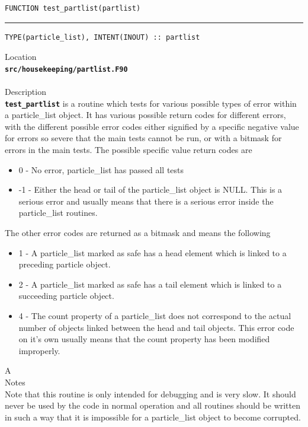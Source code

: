\documentclass[12pt,a4paper]{article}
\newcommand{\HRule}{\rule{\linewidth}{0.5mm}}
\newcommand{\inlinecode}[1]{{\color{warwickred} \bf\texttt{#1}}}
\newcommand{\codedef}{\begin{Verbatim}[formatcom=\color{warwickred},fontsize=\Large,hfuzz=0pt]}
\newcommand{\coderule}{
{\color{warwickred}\vspace{-0.5cm}\HRule}
\codedef}
\begin{document}
\pagebreak
\codedef
FUNCTION test_partlist(partlist)
\end{Verbatim}
\coderule
TYPE(particle_list), INTENT(INOUT) :: partlist
\end{Verbatim}
\vspace{1cm}
{\Large Location\\}
\inlinecode{src/housekeeping/partlist.F90}\\
\\[0.5cm]
{\Large Description\\}
\inlinecode{test\_partlist} is a routine which tests for various possible types
of error within a particle\_list object. It has various possible return codes
for different errors, with the different possible error codes either signified
by a specific negative value for errors so severe that the main tests cannot be
run, or with a bitmask for errors in the main tests. The possible specific value
return codes are
\begin{itemize}
\item 0 - No error, particle\_list has passed all tests
\item -1 - Either the head or tail of the particle\_list object is NULL. This is
  a serious error and usually means that there is a serious error inside the
  particle\_list routines.
\end{itemize}
The other error codes are returned as a bitmask and means the following
\begin{itemize}
\item 1 - A particle\_list marked as safe has a head element which is linked to
  a preceding particle object.
\item 2 - A particle\_list marked as safe has a tail element which is linked to
  a succeeding particle object.
\item 4 - The count property of a particle\_list does not correspond to the
  actual number of objects linked between the head and tail objects. This error
  code on it's own usually means that the count property has been modified
  improperly.
\end{itemize}
A
\\[0.5cm]
{\Large Notes\\}
Note that this routine is only intended for debugging and is very slow. It
should never be used by the code in normal operation and all routines should be
written in such a way that it is impossible for a particle\_list object to
become corrupted.
\end{document}
